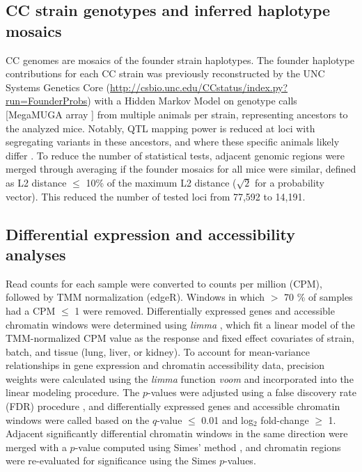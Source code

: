 \documentclass[10pt,letterpaper]{article}
\begin{document}
\subsection*{CC strain genotypes and inferred haplotype mosaics}

CC genomes are mosaics of the founder strain haplotypes. The founder haplotype contributions for each CC strain was previously reconstructed by the UNC Systems Genetics Core (\url{http://csbio.unc.edu/CCstatus/index.py?run=FounderProbs}) with a Hidden Markov Model \cite{Fu2012} on genotype calls [MegaMUGA array \cite{Morgan2016muga}] from multiple animals per strain, representing ancestors to the analyzed mice. Notably, QTL mapping power is reduced at loci with segregating variants in these ancestors, and where these specific animals likely differ \cite{Shorter2019}. To reduce the number of statistical tests, adjacent genomic regions were merged through averaging if the founder mosaics for all mice were similar, defined as L2 distance $\leq$ 10\% of the maximum L2 distance ($\sqrt{2}$ for a probability vector). This reduced the number of tested loci from 77,592 to 14,191.

\subsection*{Differential expression and accessibility analyses}

Read counts for each sample were converted to counts per million (CPM), followed by TMM normalization (edgeR). Windows in which $>$ 70 \% of samples had a CPM $\leq$ 1 were removed. Differentially expressed genes and accessible chromatin windows were determined using \textit{limma} \cite{limma}, which fit a linear model of the TMM-normalized CPM value as the response and fixed effect covariates of strain, batch, and tissue (lung, liver, or kidney). 
To account for mean-variance relationships in gene expression and chromatin accessibility data, precision weights were calculated using the \textit{limma} function \textit{voom} and incorporated into the linear modeling procedure. The $p$-values were adjusted using a false discovery rate (FDR) procedure \cite{Benjamini1995}, and differentially expressed genes and accessible chromatin windows were called based on the $q$-value $\le$ 0.01 and log$_{2}$ fold-change $\geq$ 1. Adjacent significantly differential chromatin windows in the same direction were merged with a $p$-value computed using Simes' method \cite{Sarkar1997}, and chromatin regions were re-evaluated for significance using the Simes $p$-values.
\end{document}

